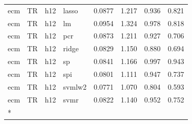 \begin{ThreePartTable}
\begin{longtable}[t]{llclcccc}
ecm & TR & h12 & lasso & 0.0877 & 1.217 & 0.936 & 0.821\\
ecm & TR & h12 & lm & 0.0954 & 1.324 & 0.978 & 0.818\\
ecm & TR & h12 & pcr & 0.0873 & 1.211 & 0.927 & 0.706\\
ecm & TR & h12 & ridge & 0.0829 & 1.150 & 0.880 & 0.694\\
ecm & TR & h12 & sp & 0.0841 & 1.166 & 0.997 & 0.943\\
ecm & TR & h12 & spi & 0.0801 & 1.111 & 0.947 & 0.737\\
ecm & TR & h12 & svmlw2 & 0.0771 & 1.070 & 0.804 & 0.593\\
ecm & TR & h12 & svmr & 0.0822 & 1.140 & 0.952 & 0.752\\*
\end{longtable}
\end{ThreePartTable}
\endgroup{}
